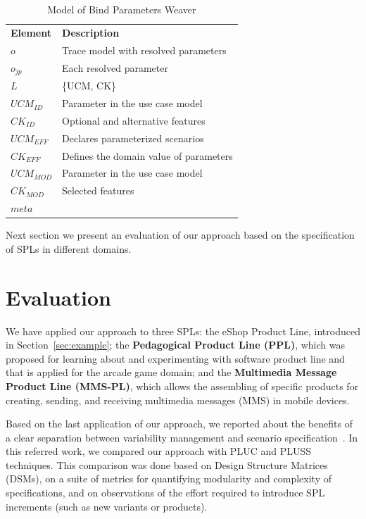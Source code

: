 \documentclass{acm_proc_article-sp}
\begin{document}
\begin{table}[h]
\begin{center}
\caption{Model of Bind Parameters Weaver} \label{tab:bp-weaver}
\begin{tabular}{p{0.6in}p{2.4in}}
   \hline\noalign{\smallskip}
  {\bf Element} & {\bf Description} \\
   \noalign{\smallskip}
   \hline
   \noalign{\smallskip}
   $o$               & Trace model with resolved parameters  \\ 
   $o_{jp}$        & Each resolved parameter \\ 
   $L$               & \{UCM, CK\} \\ 
   $UCM_{ID}$ & Parameter in the use case model \\
   $CK_{ID}$    & Optional and alternative features \\ 
   $UCM_{EFF}$ & Declares parameterized scenarios \\
   $CK_{EFF}$    & Defines the domain value of parameters \\ 
   $UCM_{MOD}$ & Parameter in the use case model \\
   $CK_{MOD}$    & Selected features \\ 
   $meta$ &  \\ 
  \hline
  \end{tabular}
\end{center}
\end{table}

Next section we present an evaluation of our approach based on the specification of SPLs in different domains. 

\section{Evaluation}
\label{sec:evaluation}

We have applied our approach to three SPLs: the eShop Product Line, introduced in Section~\ref{sec:example}; the  
{\bf Pedagogical Product Line (PPL)}, which was proposed for learning about and experimenting with software product line and that is applied for the arcade game domain; and the 
{\bf Multimedia Message Product Line (MMS-PL)}, which allows the assembling of specific products for creating, sending, and receiving multimedia messages (MMS) in mobile devices.

Based on the last application of our approach, we reported about the benefits of a clear separation between variability management and scenario specification~\cite{rbonifacio-ea-2008}. In this referred work, we compared our approach with PLUC and PLUSS techniques. This comparison was done based on Design Structure Matrices (DSMs), on a suite of metrics for quantifying modularity and complexity of specifications, and on observations of the effort required to introduce SPL increments (such as new variants or products). 
\end{document}
